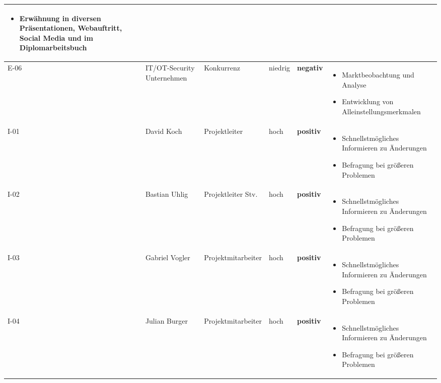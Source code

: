 \documentclass[
	headings=optiontotocandhead,%
	oneside,
	numbers=noenddot,%
	toc=flat, %
	10pt, %
	parskip=full, %
	listof=totoc, %
	listof=flat, %
	numbers=noenddot, %
	bibliography=totoc, %
	a4paper,DIV=14,
]{scrartcl}
\newcommand{\positiv}{\textbf{\textcolor[HTML]{00B050}{positiv}}}
\newcommand{\negativ}{\textbf{\textcolor[HTML]{FF0000}{negativ}}}
\newenvironment{myitemize}{
    \begin{itemize}[leftmargin=1.7em]
}{
    \end{itemize}
}
\begin{document}
\begin{longtable}{|M{1cm}|M{2.5cm}|M{3cm}|M{2cm}|M{2cm}|M{3.5cm}|}
\begin{myitemize}
	\item Erwähnung in diversen Präsentationen, Webauftritt, Social Media und im Diplomarbeitsbuch
	\end{myitemize} \\ \hline
E-06 & IT/OT-Security Unternehmen & Konkurrenz & niedrig & \negativ &
	\begin{myitemize}
    \item Marktbeobachtung und Analyse
    \item Entwicklung von Alleinstellungsmerkmalen
	\end{myitemize} \\ \hline
I-01 & David Koch & Projektleiter & hoch & \positiv & 
	\begin{myitemize}
	\item Schnellstmögliches Informieren zu Änderungen
	\item Befragung bei größeren Problemen
	\end{myitemize} \\ \hline
I-02 & Bastian Uhlig & Projektleiter Stv. & hoch & \positiv & 
	\begin{myitemize}
	\item Schnellstmögliches Informieren zu Änderungen
	\item Befragung bei größeren Problemen
	\end{myitemize} \\ \hline
I-03 & Gabriel Vogler & Projektmitarbeiter & hoch & \positiv & 
	\begin{myitemize}
	\item Schnellstmögliches Informieren zu Änderungen
	\item Befragung bei größeren Problemen
	\end{myitemize} \\ \hline
I-04 & Julian Burger & Projektmitarbeiter & hoch & \positiv & 
	\begin{myitemize}
	\item Schnellstmögliches Informieren zu Änderungen
	\item Befragung bei größeren Problemen
	\end{myitemize} \\ \hline




\end{longtable}
\end{document}
